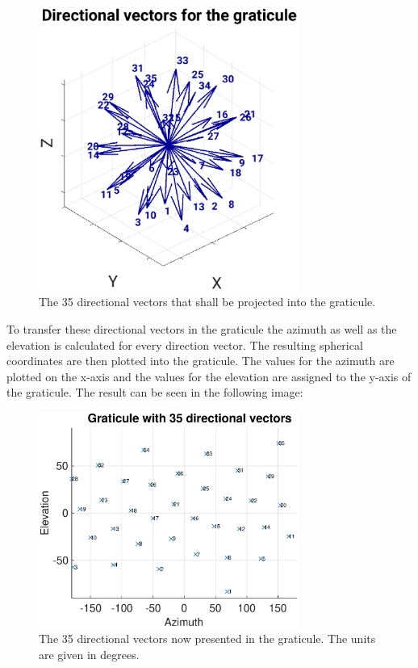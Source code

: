 \begin{figure}[H]
    \centering
    \includegraphics[width=0.76\textwidth]{Graphics/Results/gradnetz/directional_vectors_for_gradnetz.eps}
    \caption{The 35 directional vectors that shall be projected into the graticule. }
    \label{fig:gadnetz_directional_vectors}
\end{figure}

To transfer these directional vectors in the graticule the azimuth as well as the elevation is calculated for every direction vector. The resulting spherical coordinates are then plotted into the graticule. The values for the azimuth are plotted on the x-axis and the values for the elevation are assigned to the y-axis of the graticule. The result can be seen in the following image:

\begin{figure}[H]
    \centering
    \includegraphics[width=0.76\textwidth]{Graphics/Results/gradnetz/graticule_35_vectors.eps}
    \caption{The 35 directional vectors now presented in the graticule. The units are given in degrees. }
    \label{fig:fertig_gradnetz}
\end{figure}

